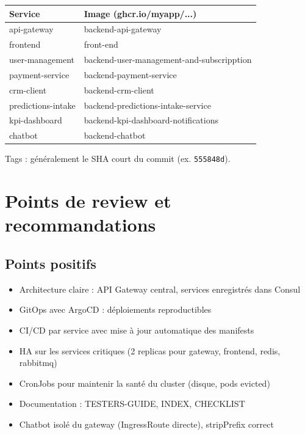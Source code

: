 \documentclass[11pt,a4paper]{article}
\begin{document}
\begin{center}
\begin{tabular}{@{}ll@{}}
\toprule
\textbf{Service} & \textbf{Image (ghcr.io/myapp/...)} \\
\midrule
api-gateway & backend-api-gateway \\
frontend & front-end \\
user-management & backend-user-management-and-subscripption \\
payment-service & backend-payment-service \\
crm-client & backend-crm-client \\
predictions-intake & backend-predictions-intake-service \\
kpi-dashboard & backend-kpi-dashboard-notifications \\
chatbot & backend-chatbot \\
\bottomrule
\end{tabular}
\end{center}

Tags : généralement le SHA court du commit (ex. \texttt{555848d}).

\section{Points de review et recommandations}

\subsection{Points positifs}

\begin{itemize}
  \item Architecture claire : API Gateway central, services enregistrés dans Consul
  \item GitOps avec ArgoCD : déploiements reproductibles
  \item CI/CD par service avec mise à jour automatique des manifests
  \item HA sur les services critiques (2 replicas pour gateway, frontend, redis, rabbitmq)
  \item CronJobs pour maintenir la santé du cluster (disque, pods evicted)
  \item Documentation : TESTERS-GUIDE, INDEX, CHECKLIST
  \item Chatbot isolé du gateway (IngressRoute directe), stripPrefix correct
\end{itemize}
\end{document}
